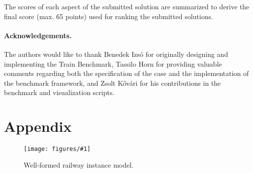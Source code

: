 \documentclass[submission,copyright,creativecommons]{eptcs}
\newcommand{\tb}{Train Benchmark\xspace}
\newcommand{\ttcfig}[2]{
\begin{figure}[htb] 
	\centering
	\texttt{[image: figures/\#1]}
	\caption{#2.}
	\label{fig:#1}
\end{figure}}
\begin{document}
The scores of each aspect of the submitted solution are summarized to derive the final score (max. 65 points) used for ranking the submitted solutions.

\paragraph{Acknowledgements.} The authors would like to thank Benedek Izsó for originally designing and implementing the \tb, Tassilo Horn for providing  valuable comments regarding both the specification of the case and the implementation of the benchmark framework, and Zsolt Kővári for his contributions in the benchmark and visualization scripts.




\clearpage

\appendix
\section{Appendix}

\ttcfig{railway-yed}{Well-formed railway instance model}
\end{document}

